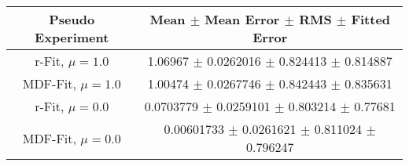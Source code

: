 \begin{table}
\centering
\begin{tabular}{cc}
\toprule
Pseudo Experiment & Mean $\pm$ Mean Error $\pm$ RMS $\pm$ Fitted Error\\
\midrule
r-Fit, $\mu=\num[round-precision=1]{1.0}$ & \num[color=KIT-Lila]{1.06967} $\pm$ \num[color=KIT-Lila]{0.0262016} $\pm$ \num{0.824413} $\pm$ \num{0.814887}\\
MDF-Fit, $\mu=\num[round-precision=1]{1.0}$ & \num[color=KIT-Orange]{1.00474} $\pm$ \num[color=KIT-Orange]{0.0267746} $\pm$ \num{0.842443} $\pm$ \num{0.835631}\\
r-Fit, $\mu=\num[round-precision=1]{0.0}$ & \num[color=KIT-Lila]{0.0703779} $\pm$ \num[color=KIT-Lila]{0.0259101} $\pm$ \num{0.803214} $\pm$ \num{0.77681}\\
MDF-Fit, $\mu=\num[round-precision=1]{0.0}$ & \num[color=KIT-Orange]{0.00601733} $\pm$ \num[color=KIT-Orange]{0.0261621} $\pm$ \num{0.811024} $\pm$ \num{0.796247}\\
\bottomrule
\end{tabular}
\end{table}